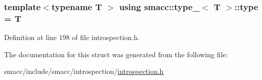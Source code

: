\subsubsection[{\texorpdfstring{type}{type}}]{\setlength{\rightskip}{0pt plus 5cm}template$<$typename T $>$ using {\bf smacc\+::type\+\_\+}$<$ T $>$\+::{\bf type} =  T}\hypertarget{structsmacc_1_1type___a9b8fcdd94d0e9fc71366e867a4094463}{}\label{structsmacc_1_1type___a9b8fcdd94d0e9fc71366e867a4094463}


Definition at line 198 of file introspection.\+h.



The documentation for this struct was generated from the following file\+:\begin{DoxyCompactItemize}
\item 
smacc/include/smacc/introspection/\hyperlink{introspection_8h}{introspection.\+h}\end{DoxyCompactItemize}
